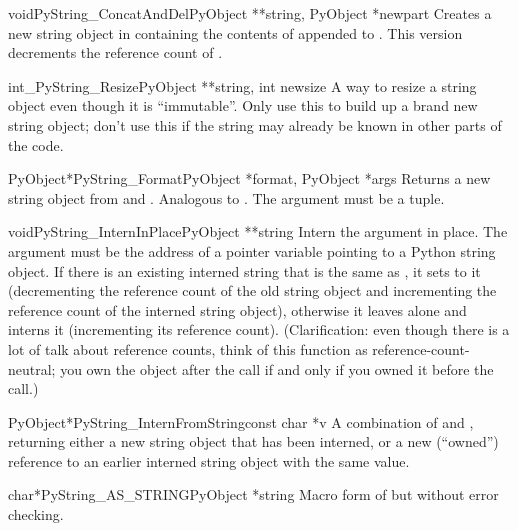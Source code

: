 \documentclass{manual}
\begin{document}
\begin{cfuncdesc}{void}{PyString_ConcatAndDel}{PyObject **string,
                                               PyObject *newpart}
Creates a new string object in  containing the contents
of  appended to .  This version decrements
the reference count of .
\end{cfuncdesc}

\begin{cfuncdesc}{int}{_PyString_Resize}{PyObject **string, int newsize}
A way to resize a string object even though it is ``immutable''.  
Only use this to build up a brand new string object; don't use this if
the string may already be known in other parts of the code.
\end{cfuncdesc}

\begin{cfuncdesc}{PyObject*}{PyString_Format}{PyObject *format,
                                              PyObject *args}
Returns a new string object from  and .  Analogous
to .  The  argument must be
a tuple.
\end{cfuncdesc}

\begin{cfuncdesc}{void}{PyString_InternInPlace}{PyObject **string}
Intern the argument  in place.  The argument must be the
address of a pointer variable pointing to a Python string object.
If there is an existing interned string that is the same as
, it sets  to it (decrementing the reference 
count of the old string object and incrementing the reference count of
the interned string object), otherwise it leaves  alone
and interns it (incrementing its reference count).  (Clarification:
even though there is a lot of talk about reference counts, think of
this function as reference-count-neutral; you own the object after
the call if and only if you owned it before the call.)
\end{cfuncdesc}

\begin{cfuncdesc}{PyObject*}{PyString_InternFromString}{const char *v}
A combination of  and
, returning either a new string object
that has been interned, or a new (``owned'') reference to an earlier
interned string object with the same value.
\end{cfuncdesc}

\begin{cfuncdesc}{char*}{PyString_AS_STRING}{PyObject *string}
Macro form of  but without error checking.
\end{cfuncdesc}
\end{document}
